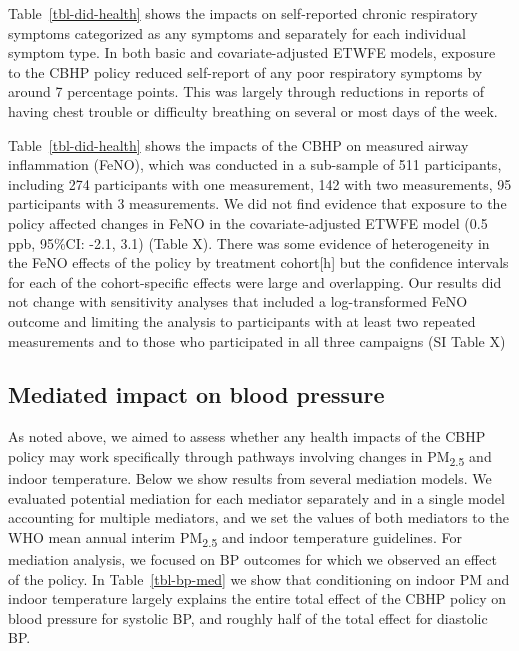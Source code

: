 \documentclass[
  letterpaper,
  DIV=11,
  numbers=noendperiod]{scrartcl}
\begin{document}
Table~\ref{tbl-did-health} shows the impacts on self-reported chronic
respiratory symptoms categorized as any symptoms and separately for each
individual symptom type. In both basic and covariate-adjusted ETWFE
models, exposure to the CBHP policy reduced self-report of any poor
respiratory symptoms by around 7 percentage points. This was largely
through reductions in reports of having chest trouble or difficulty
breathing on several or most days of the week.

Table~\ref{tbl-did-health} shows the impacts of the CBHP on measured
airway inflammation (FeNO), which was conducted in a sub-sample of 511
participants, including 274 participants with one measurement, 142 with
two measurements, 95 participants with 3 measurements. We did not find
evidence that exposure to the policy affected changes in FeNO in the
covariate-adjusted ETWFE model (0.5 ppb, 95\%CI: -2.1, 3.1) (Table X).
There was some evidence of heterogeneity in the FeNO effects of the
policy by treatment cohort{[}h{]} but the confidence intervals for each
of the cohort-specific effects were large and overlapping. Our results
did not change with sensitivity analyses that included a log-transformed
FeNO outcome and limiting the analysis to participants with at least two
repeated measurements and to those who participated in all three
campaigns (SI Table X)

\hypertarget{mediated-impact-on-blood-pressure}{%
\subsection{Mediated impact on blood
pressure}\label{mediated-impact-on-blood-pressure}}

As noted above, we aimed to assess whether any health impacts of the
CBHP policy may work specifically through pathways involving changes in
PM\textsubscript{2.5} and indoor temperature. Below we show results from
several mediation models. We evaluated potential mediation for each
mediator separately and in a single model accounting for multiple
mediators, and we set the values of both mediators to the WHO mean
annual interim PM\textsubscript{2.5} and indoor temperature guidelines.
For mediation analysis, we focused on BP outcomes for which we observed
an effect of the policy. In Table~\ref{tbl-bp-med} we show that
conditioning on indoor PM and indoor temperature largely explains the
entire total effect of the CBHP policy on blood pressure for systolic
BP, and roughly half of the total effect for diastolic BP.
\end{document}
